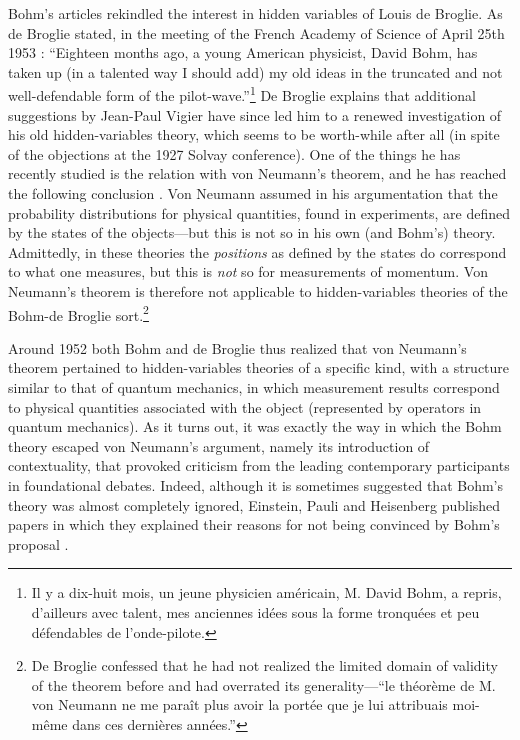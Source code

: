 \documentclass[12pt]{article}
\begin{document}
Bohm's articles rekindled the interest in hidden variables of Louis de Broglie. As de Broglie stated, in the meeting of the French Academy of Science of April 25th 1953 \cite[p.\@ 450]{debroglie}: ``Eighteen months ago, a young American physicist, David Bohm, has taken up (in a talented way I should add) my old ideas in the truncated and not well-defendable form of the pilot-wave.''\footnote{Il y a dix-huit mois, un jeune physicien am\'{e}ricain, M. David Bohm, a repris, d'ailleurs avec talent, mes anciennes id\'{e}es sous la forme tronqu\'{e}es et peu d\'{e}fendables de l'onde-pilote.} De Broglie explains that additional suggestions by Jean-Paul Vigier have since led him to a renewed investigation of his old hidden-variables theory, which seems to be worth-while after all (in spite of the objections at the 1927 Solvay conference). One of the things he has recently studied is the relation with von Neumann's theorem, and he has reached the following conclusion \cite[p.\@ 468]{debroglie}. Von Neumann assumed in his argumentation that the probability distributions for physical quantities, found in experiments, are defined by the states of the objects---but this is not so in his own (and Bohm's) theory. Admittedly, in these theories the \emph{positions} as defined by the states do correspond to what one measures, but this is \emph{not} so for measurements of momentum. Von Neumann's theorem is therefore not applicable to hidden-variables theories of the Bohm-de Broglie sort.\footnote{De Broglie confessed that he had not realized the limited domain of validity of the theorem before and had overrated its generality---``le th\'{e}or\`{e}me de M. von Neumann ne me para\^{i}t plus avoir la port\'{e}e que je lui attribuais moi-m\^{e}me dans ces derni\`{e}res ann\'{e}es.''}

Around 1952 both Bohm and de Broglie thus realized  that von Neumann's theorem pertained to hidden-variables theories of a specific kind, with a structure similar to that of quantum mechanics, in which measurement results correspond to physical quantities associated with the object (represented by operators in quantum mechanics). As it turns out, it was exactly the way in which the Bohm theory escaped von Neumann's argument, namely its introduction of contextuality, that provoked criticism from the leading contemporary participants in foundational debates. Indeed, although it is sometimes suggested that Bohm's theory was almost completely ignored, Einstein, Pauli and Heisenberg published papers in which they explained their reasons for not being convinced by Bohm's proposal \cite{myrvold}.
\end{document}
